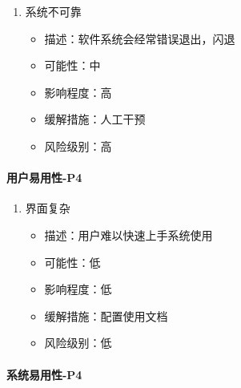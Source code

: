 \documentclass[hyperref, a4paper]{ctexart}
\providecommand{\tightlist}{%
  \setlength{\itemsep}{0pt}\setlength{\parskip}{0pt}}
\let\oldparagraph\paragraph
\renewcommand{\paragraph}[1]{\oldparagraph{#1}\mbox{}}
\begin{document}
\begin{enumerate}
\def\labelenumi{\arabic{enumi}.}
\tightlist
\item
  系统不可靠

  \begin{itemize}
  \tightlist
  \item
    描述：软件系统会经常错误退出，闪退
  \item
    可能性：中
  \item
    影响程度：高
  \item
    缓解措施：人工干预
  \item
    风险级别：高
  \end{itemize}
\end{enumerate}

\hypertarget{ux7528ux6237ux6613ux7528ux6027-p4}{%
\paragraph{用户易用性-P4}\label{ux7528ux6237ux6613ux7528ux6027-p4}}

\begin{enumerate}
\def\labelenumi{\arabic{enumi}.}
\tightlist
\item
  界面复杂

  \begin{itemize}
  \tightlist
  \item
    描述：用户难以快速上手系统使用
  \item
    可能性：低
  \item
    影响程度：低
  \item
    缓解措施：配置使用文档
  \item
    风险级别：低
  \end{itemize}
\end{enumerate}

\hypertarget{ux7cfbux7edfux6613ux7528ux6027-p4}{%
\paragraph{系统易用性-P4}\label{ux7cfbux7edfux6613ux7528ux6027-p4}}
\end{document}
